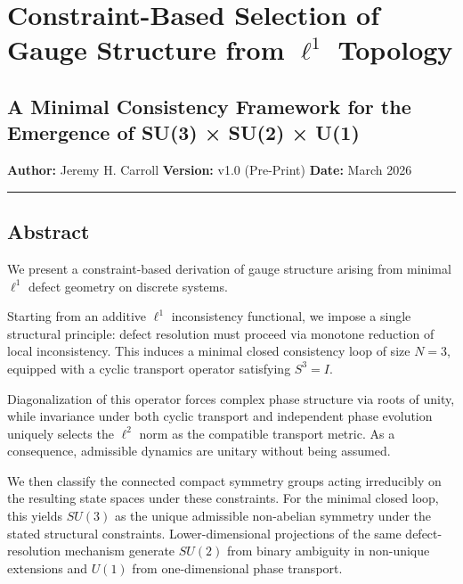 \documentclass[
]{article}
\author{}
\date{}
\begin{document}
\hypertarget{constraint-based-selection-of-gauge-structure-from-ell1-topology}{%
\section{\texorpdfstring{Constraint-Based Selection of Gauge Structure
from \(\ell^1\)
Topology}{Constraint-Based Selection of Gauge Structure from \textbackslash ell\^{}1 Topology}}\label{constraint-based-selection-of-gauge-structure-from-ell1-topology}}

\hypertarget{a-minimal-consistency-framework-for-the-emergence-of-su3-su2-u1}{%
\subsection{A Minimal Consistency Framework for the Emergence of SU(3) ×
SU(2) ×
U(1)}\label{a-minimal-consistency-framework-for-the-emergence-of-su3-su2-u1}}

\textbf{Author:} Jeremy H. Carroll \textbf{Version:} v1.0 (Pre-Print)
\textbf{Date:} March 2026

\begin{center}\rule{0.5\linewidth}{0.5pt}\end{center}

\hypertarget{abstract}{%
\subsection{Abstract}\label{abstract}}

We present a constraint-based derivation of gauge structure arising from
minimal \(\ell^1\) defect geometry on discrete systems.

Starting from an additive \(\ell^1\) inconsistency functional, we impose
a single structural principle: defect resolution must proceed via
monotone reduction of local inconsistency. This induces a minimal closed
consistency loop of size \(N = 3\), equipped with a cyclic transport
operator satisfying \(S^3 = I\).

Diagonalization of this operator forces complex phase structure via
roots of unity, while invariance under both cyclic transport and
independent phase evolution uniquely selects the \(\ell^2\) norm as the
compatible transport metric. As a consequence, admissible dynamics are
unitary without being assumed.

We then classify the connected compact symmetry groups acting
irreducibly on the resulting state spaces under these constraints. For
the minimal closed loop, this yields \(SU(3)\) as the unique admissible
non-abelian symmetry under the stated structural constraints.
Lower-dimensional projections of the same defect-resolution mechanism
generate \(SU(2)\) from binary ambiguity in non-unique extensions and
\(U(1)\) from one-dimensional phase transport.
\end{document}

